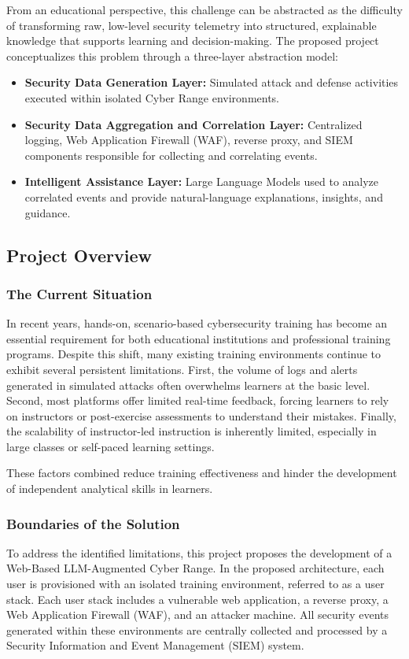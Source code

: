 From an educational perspective, this challenge can be abstracted as the difficulty of transforming raw, low-level security telemetry into structured, explainable knowledge that supports learning and decision-making. The proposed project conceptualizes this problem through a three-layer abstraction model:
\begin{itemize}
	\item \textbf{Security Data Generation Layer:} Simulated attack and defense activities executed within isolated Cyber Range environments.
	\item \textbf{Security Data Aggregation and Correlation Layer:} Centralized logging, Web Application Firewall (WAF), reverse proxy, and SIEM components responsible for collecting and correlating events.
	\item \textbf{Intelligent Assistance Layer:} Large Language Models used to analyze correlated events and provide natural-language explanations, insights, and guidance.
\end{itemize}

\subsection{Project Overview}

\subsubsection{The Current Situation}
In recent years, hands-on, scenario-based cybersecurity training has become an essential requirement for both educational institutions and professional training programs. Despite this shift, many existing training environments continue to exhibit several persistent limitations. First, the volume of logs and alerts generated in simulated attacks often overwhelms learners at the basic level. Second, most platforms offer limited real-time feedback, forcing learners to rely on instructors or post-exercise assessments to understand their mistakes. Finally, the scalability of instructor-led instruction is inherently limited, especially in large classes or self-paced learning settings.

These factors combined reduce training effectiveness and hinder the development of independent analytical skills in learners.

\subsubsection{Boundaries of the Solution}
To address the identified limitations, this project proposes the development of a Web-Based LLM-Augmented Cyber Range. In the proposed architecture, each user is provisioned with an isolated training environment, referred to as a user stack. Each user stack includes a vulnerable web application, a reverse proxy, a Web Application Firewall (WAF), and an attacker machine. All security events generated within these environments are centrally collected and processed by a Security Information and Event Management (SIEM) system.

